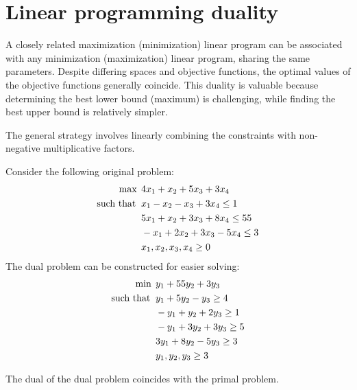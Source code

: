 \section{Linear programming duality}

A closely related maximization (minimization) linear program can be associated with any minimization (maximization) linear program, sharing the same parameters.
Despite differing spaces and objective functions, the optimal values of the objective functions generally coincide. 
This duality is valuable because determining the best lower bound (maximum) is challenging, while finding the best upper bound is relatively simpler.

The general strategy involves linearly combining the constraints with non-negative multiplicative factors.
\begin{example}
    Consider the following original problem:
    \begin{align*}
        \max                      \:&\: 4x_1+x_2+5x_3+3x_4          \\
        \textnormal{such that }     &\: x_1-x_2-x_3+3x_4 \leq 1     \\
                                    &\: 5x_1+x_2+3x_3+8x_4 \leq 55  \\
                                    &\: -x_1+2x_2+3x_3-5x_4 \leq 3  \\
                                    &\: x_1,x_2,x_3,x_4 \geq 0      
    \end{align*}
    The dual problem can be constructed for easier solving:
    \begin{align*}
        \min                      \:&\: y_1+55y_2+3y_3              \\
        \textnormal{such that }     &\: y_1+5y_2-y_3 \geq 4         \\
                                    &\: -y_1+y_2+2y_3 \geq 1        \\
                                    &\: -y_1+3y_2+3y_3 \geq 5       \\
                                    &\: 3y_1+8y_2-5y_3 \geq 3       \\   
                                    &\: y_1,y_2,y_3 \geq 3          \\
    \end{align*}
\end{example}
\begin{property}
    The dual of the dual problem coincides with the primal problem.
\end{property}
